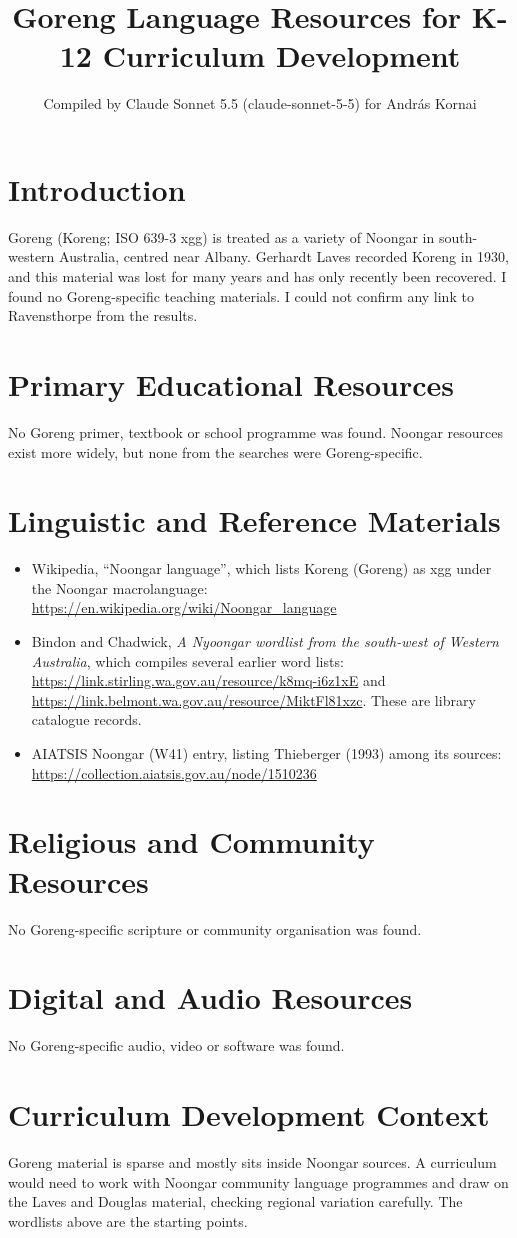 \documentclass[12pt]{article}
\title{Goreng Language Resources for K-12 Curriculum Development}
\author{Compiled by Claude Sonnet 5.5 (claude-sonnet-5-5) for Andr\'as Kornai}
\date{}
\begin{document}
\maketitle

\section{Introduction}
Goreng (Koreng; ISO 639-3 xgg) is treated as a variety of Noongar in south-western Australia, centred near Albany. Gerhardt Laves recorded Koreng in 1930, and this material was lost for many years and has only recently been recovered. I found no Goreng-specific teaching materials. I could not confirm any link to Ravensthorpe from the results.

\section{Primary Educational Resources}
No Goreng primer, textbook or school programme was found. Noongar resources exist more widely, but none from the searches were Goreng-specific.

\section{Linguistic and Reference Materials}
\begin{itemize}
\item Wikipedia, ``Noongar language'', which lists Koreng (Goreng) as xgg under the Noongar macrolanguage: \url{https://en.wikipedia.org/wiki/Noongar_language}
\item Bindon and Chadwick, \emph{A Nyoongar wordlist from the south-west of Western Australia}, which compiles several earlier word lists: \url{https://link.stirling.wa.gov.au/resource/k8mq-i6z1xE} and \url{https://link.belmont.wa.gov.au/resource/MiktFl81xzc}. These are library catalogue records.
\item AIATSIS Noongar (W41) entry, listing Thieberger (1993) among its sources: \url{https://collection.aiatsis.gov.au/node/1510236}
\end{itemize}

\section{Religious and Community Resources}
No Goreng-specific scripture or community organisation was found.

\section{Digital and Audio Resources}
No Goreng-specific audio, video or software was found.

\section{Curriculum Development Context}
Goreng material is sparse and mostly sits inside Noongar sources. A curriculum would need to work with Noongar community language programmes and draw on the Laves and Douglas material, checking regional variation carefully. The wordlists above are the starting points.
\end{document}
